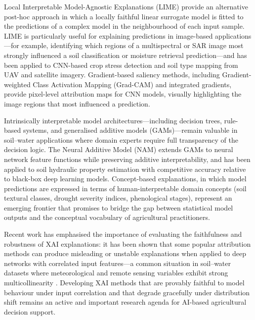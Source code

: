 \documentclass[land,article,submit,pdftex,moreauthors]{Definitions/mdpi}
\numberwithin{equation}{section}
\begin{document}
Local Interpretable Model-Agnostic Explanations (LIME) \citep{ribeiro2016lime} provide an alternative post-hoc approach in which a locally faithful linear surrogate model is fitted to the predictions of a complex model in the neighbourhood of each input sample. LIME is particularly useful for explaining predictions in image-based applications---for example, identifying which regions of a multispectral or SAR image most strongly influenced a soil classification or moisture retrieval prediction---and has been applied to CNN-based crop stress detection and soil type mapping from UAV and satellite imagery. Gradient-based saliency methods, including Gradient-weighted Class Activation Mapping (Grad-CAM) \citep{selvaraju2017gradcam} and integrated gradients, provide pixel-level attribution maps for CNN models, visually highlighting the image regions that most influenced a prediction.

Intrinsically interpretable model architectures---including decision trees, rule-based systems, and generalised additive models (GAMs)---remain valuable in soil--water applications where domain experts require full transparency of the decision logic. The Neural Additive Model (NAM) \citep{agarwal2021neural} extends GAMs to neural network feature functions while preserving additive interpretability, and has been applied to soil hydraulic property estimation with competitive accuracy relative to black-box deep learning models. Concept-based explanations, in which model predictions are expressed in terms of human-interpretable domain concepts (soil textural classes, drought severity indices, phenological stages), represent an emerging frontier that promises to bridge the gap between statistical model outputs and the conceptual vocabulary of agricultural practitioners.

Recent work has emphasised the importance of evaluating the faithfulness and robustness of XAI explanations: it has been shown that some popular attribution methods can produce misleading or unstable explanations when applied to deep networks with correlated input features---a common situation in soil--water datasets where meteorological and remote sensing variables exhibit strong multicollinearity \citep{adebayo2018sanity}. Developing XAI methods that are provably faithful to model behaviour under input correlation and that degrade gracefully under distribution shift remains an active and important research agenda for AI-based agricultural decision support.

\end{document}
